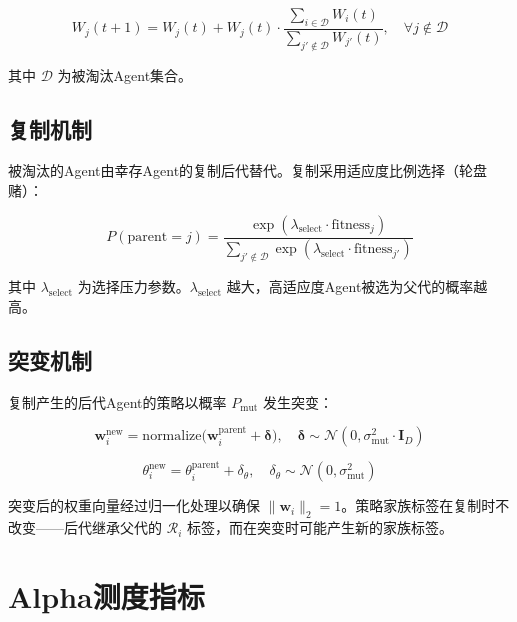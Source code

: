 \begin{equation}
W_j(t+1) = W_j(t) + W_j(t) \cdot \frac{\sum_{i \in \mathcal{D}} W_i(t)}{\sum_{j' \notin \mathcal{D}} W_{j'}(t)}, \quad \forall j \notin \mathcal{D}
\label{eq:redistribution}
\end{equation}

其中 $\mathcal{D}$ 为被淘汰Agent集合。

\subsection{复制机制}

被淘汰的Agent由幸存Agent的复制后代替代。复制采用适应度比例选择（轮盘赌）：

\begin{equation}
P(\text{parent} = j) = \frac{\exp(\lambda_{\text{select}} \cdot \text{fitness}_j)}{\sum_{j' \notin \mathcal{D}} \exp(\lambda_{\text{select}} \cdot \text{fitness}_{j'})}
\label{eq:roulette}
\end{equation}

其中 $\lambda_{\text{select}}$ 为选择压力参数。$\lambda_{\text{select}}$ 越大，高适应度Agent被选为父代的概率越高。

\subsection{突变机制}

复制产生的后代Agent的策略以概率 $P_{\text{mut}}$ 发生突变：

\begin{equation}
\mathbf{w}_i^{\text{new}} = \text{normalize}\bigl(\mathbf{w}_i^{\text{parent}} + \boldsymbol{\delta}\bigr), \quad \boldsymbol{\delta} \sim \mathcal{N}(0, \sigma_{\text{mut}}^2 \cdot \mathbf{I}_D)
\label{eq:mutation}
\end{equation}

\begin{equation}
\theta_i^{\text{new}} = \theta_i^{\text{parent}} + \delta_\theta, \quad \delta_\theta \sim \mathcal{N}(0, \sigma_{\text{mut}}^2)
\end{equation}

突变后的权重向量经过归一化处理以确保 $\|\mathbf{w}_i\|_2 = 1$。策略家族标签在复制时不改变——后代继承父代的 $\mathcal{R}_i$ 标签，而在突变时可能产生新的家族标签。

\section{Alpha测度指标}

